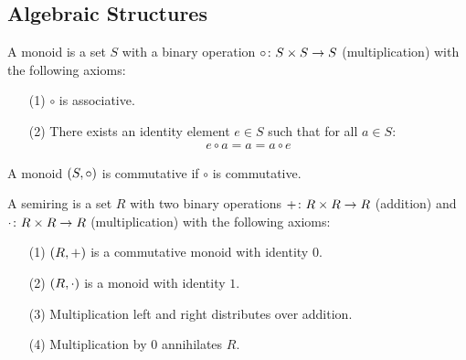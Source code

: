 \subsection{Algebraic Structures}

\begin{definition}[Monoid]
  A monoid is a set \(S\) with a binary operation
  \(\circ \colon S \times S \to S\) (multiplication) with the following axioms:
  \begin{enumerate}
    \item[(1)]
      \(\circ\) is associative.

    \item[(2)]
      There exists an identity element \(e \in S\) such that for all
      \(a \in S\):
      \begin{align*}
        e \circ a = a = a \circ e
      \end{align*}
  \end{enumerate}
\end{definition}

\begin{definition}
  A monoid \(\left(S, \circ\right)\) is commutative if \(\circ\) is commutative.
\end{definition}

\begin{definition}[Semiring]
  A semiring is a set \(R\) with two binary operations
  \(+ \colon R \times R \to R\) (addition) and
  \(\cdot \colon R \times R \to R\) (multiplication) with the following axioms:
  \begin{enumerate}
    \item[(1)]
      \(\left(R, +\right)\) is a commutative monoid with identity \(0\).

    \item[(2)]
      \(\left(R, \cdot\right)\) is a monoid with identity \(1\).

    \item[(3)]
      Multiplication left and right distributes over addition.

    \item[(4)]
      Multiplication by \(0\) annihilates \(R\).
  \end{enumerate}
\end{definition}


